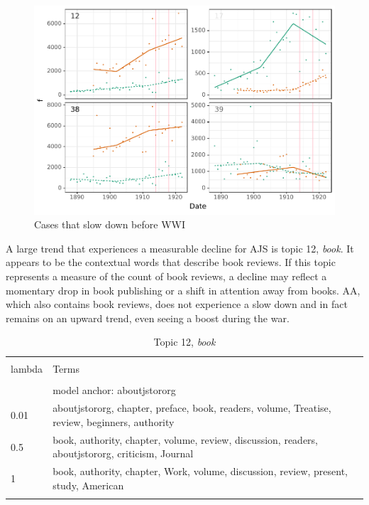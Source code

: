 \documentclass[]{book}
\theoremstyle{definition}
\theoremstyle{definition}
\theoremstyle{definition}
\theoremstyle{remark}
\begin{document}
\begin{figure}

{\centering \includegraphics[width=0.9\linewidth]{04_files/figure-latex/slwdwn-1} 

}

\caption{Cases that slow down before WWI}\label{fig:slwdwn}
\end{figure}

A large trend that experiences a measurable decline for AJS is topic 12,
\emph{book}. It appears to be the contextual words that describe book
reviews. If this topic represents a measure of the count of book
reviews, a decline may reflect a momentary drop in book publishing or a
shift in attention away from books. AA, which also contains book
reviews, does not experience a slow down and in fact remains on an
upward trend, even seeing a boost during the war.



\begin{table}[!htbp] \centering 
  \caption{Topic 12, \emph{book}} 
  \label{tab:t12-h} 
\begin{tabularx}{\textwidth}{@{\extracolsep{5pt}} lY} 
\\[-1.8ex]\hline 
\hline \\[-1.8ex] 
lambda & Terms \\ 
\hline \\[-1.8ex] 
 & model anchor: aboutjstororg \\ 
0.01 & aboutjstororg, chapter, preface, book, readers, volume, Treatise, review, beginners, authority \\ 
0.5 & book, authority, chapter, volume, review, discussion, readers, aboutjstororg, criticism, Journal \\ 
1 & book, authority, chapter, Work, volume, discussion, review, present, study, American \\ 
\hline \\[-1.8ex] 
\end{tabularx} 
\end{table}
\end{document}
